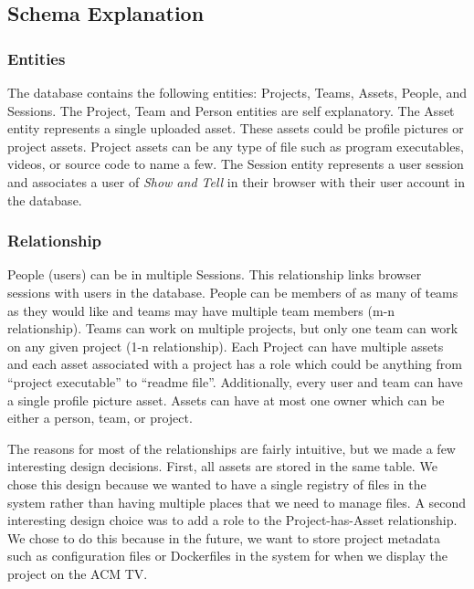 \documentclass[12pt]{article}
\newcommand{\app}{\textit{Show and Tell}\xspace}
\begin{document}
\subsection{Schema Explanation}
%
\subsubsection{Entities}
The database contains the following entities: Projects, Teams, Assets, People,
and Sessions. The Project, Team and Person entities are self explanatory. The
Asset entity represents a single uploaded asset. These assets could be profile
pictures or project assets. Project assets can be any type of file such as
program executables, videos, or source code to name a few. The Session entity
represents a user session and associates a user of \app in their browser with
their user account in the database.

\subsubsection{Relationship}
People (users) can be in multiple Sessions. This relationship links browser
sessions with users in the database. People can be members of as many of teams
as they would like and teams may have multiple team members (m-n relationship).
Teams can work on multiple projects, but only one team can work on any given
project (1-n relationship). Each Project can have multiple assets and each asset
associated with a project has a role which could be anything from “project
executable” to “readme file”. Additionally, every user and team can have a
single profile picture asset. Assets can have at most one owner which can be
either a person, team, or project.

The reasons for most of the relationships are fairly intuitive, but we made a
few interesting design decisions. First, all assets are stored in the same
table. We chose this design because we wanted to have a single registry of files
in the system rather than having multiple places that we need to manage files. A
second interesting design choice was to add a role to the Project-has-Asset
relationship. We chose to do this because in the future, we want to store
project metadata such as configuration files or Dockerfiles in the system for
when we display the project on the ACM TV.
\end{document}

